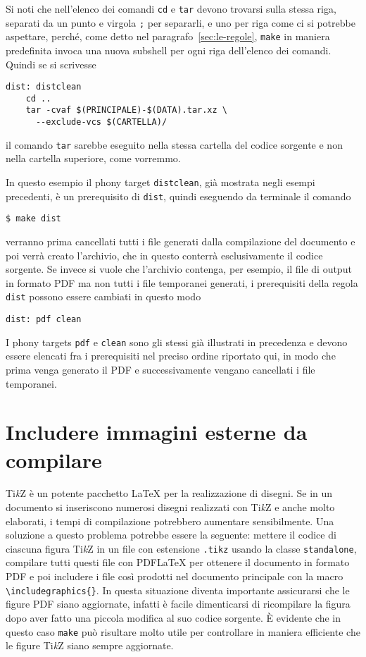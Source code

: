 Si noti che nell'elenco dei comandi \texttt{cd} e \texttt{tar} devono trovarsi
sulla stessa riga, separati da un punto e virgola \texttt{;} per separarli, e
uno per riga come ci si potrebbe aspettare, perché, come detto nel
paragrafo~\ref{sec:le-regole}, \texttt{make} in maniera predefinita invoca una
nuova subshell per ogni riga dell'elenco dei comandi.  Quindi se si scrivesse
\begin{lstlisting}
dist: distclean
	cd ..
	tar -cvaf $(PRINCIPALE)-$(DATA).tar.xz \
	  --exclude-vcs $(CARTELLA)/
\end{lstlisting}
il comando \texttt{tar} sarebbe eseguito nella stessa cartella del codice
sorgente e non nella cartella superiore, come vorremmo.

In questo esempio il phony target \texttt{distclean}, già mostrata negli esempi
precedenti, è un prerequisito di \texttt{dist}, quindi eseguendo da terminale il
comando
\begin{verbatim}
$ make dist
\end{verbatim}
verranno prima cancellati tutti i file generati dalla compilazione del documento
e poi verrà creato l'archivio, che in questo conterrà esclusivamente il codice
sorgente.  Se invece si vuole che l'archivio contenga, per esempio, il file di
output in formato \textsc{PDF} ma non tutti i file temporanei generati, i
prerequisiti della regola \texttt{dist} possono essere cambiati in questo modo
\begin{lstlisting}
dist: pdf clean
\end{lstlisting}
I phony targets \texttt{pdf} e \texttt{clean} sono gli stessi già illustrati in
precedenza e devono essere elencati fra i prerequisiti nel preciso ordine
riportato qui, in modo che prima venga generato il \textsc{PDF} e
successivamente vengano cancellati i file temporanei.

\section{Includere immagini esterne da compilare}
\label{sec:includere-immagini-esterne}

Ti\emph{k}Z è un potente pacchetto \LaTeX{}
per la realizzazione di disegni.  Se in un documento si inseriscono numerosi
disegni realizzati con Ti\emph{k}Z e anche molto elaborati, i tempi di
compilazione potrebbero aumentare sensibilmente.  Una soluzione a questo
problema potrebbe essere la seguente: mettere il codice di ciascuna figura
Ti\emph{k}Z in un file con estensione \texttt{.tikz} usando la classe
\texttt{standalone}, compilare tutti questi file con \textsc{PDF}\LaTeX{}
per ottenere il documento in formato \textsc{PDF} e poi includere i file così
prodotti nel documento principale con la macro
\texttt{\textbackslash{}includegraphics\{\}}.  In questa situazione diventa
importante assicurarsi che le figure PDF siano aggiornate, infatti è facile
dimenticarsi di ricompilare la figura dopo aver fatto una piccola modifica al
suo codice sorgente.  È evidente che in questo caso \texttt{make} può risultare
molto utile per controllare in maniera efficiente che le figure Ti\emph{k}Z
siano sempre aggiornate.

